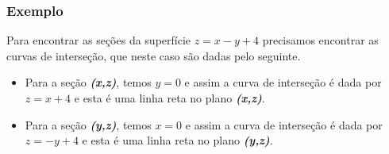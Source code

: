 \documentclass[a4paper]{article}
\begin{document}
\subsubsection*{Exemplo}
Para encontrar as seções da superfície $z = x - y + 4$ precisamos encontrar as curvas de interseção, que neste caso são dadas pelo seguinte.
\begin{itemize}
    \item Para a seção \textit{\textbf{(x,z)}}, temos $y = 0$ e assim a curva de interseção é dada por $z = x + 4$ e esta é uma linha reta no plano \textit{\textbf{(x,z)}}.
    \item Para a seção \textit{\textbf{(y,z)}}, temos $x = 0$ e assim a curva de interseção é dada por $z = -y + 4$ e esta é uma linha reta no plano \textit{\textbf{(y,z)}}.
\end{itemize}
\begin{figure}[ht]
    \centering
{}
\end{figure}
\end{document}
